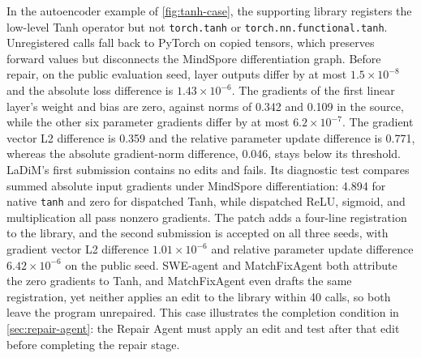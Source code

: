 In the autoencoder example of \cref{fig:tanh-case}, the supporting library registers the low-level Tanh operator but not \texttt{torch.tanh} or \texttt{torch.nn.functional.tanh}. Unregistered calls fall back to PyTorch on copied tensors, which preserves forward values but disconnects the MindSpore differentiation graph. Before repair, on the public evaluation seed, layer outputs differ by at most $1.5\times10^{-8}$ and the absolute loss difference is $1.43\times10^{-6}$. The gradients of the first linear layer's weight and bias are zero, against norms of 0.342 and 0.109 in the source, while the other six parameter gradients differ by at most $6.2\times10^{-7}$. The gradient vector L2 difference is 0.359 and the relative parameter update difference is 0.771, whereas the absolute gradient-norm difference, 0.046, stays below its threshold. LaDiM's first submission contains no edits and fails. Its diagnostic test compares summed absolute input gradients under MindSpore differentiation: 4.894 for native \texttt{tanh} and zero for dispatched Tanh, while dispatched ReLU, sigmoid, and multiplication all pass nonzero gradients. The patch adds a four-line registration to the library, and the second submission is accepted on all three seeds, with gradient vector L2 difference $1.01\times10^{-6}$ and relative parameter update difference $6.42\times10^{-6}$ on the public seed. SWE-agent and MatchFixAgent both attribute the zero gradients to Tanh, and MatchFixAgent even drafts the same registration, yet neither applies an edit to the library within 40 calls, so both leave the program unrepaired. This case illustrates the completion condition in \cref{sec:repair-agent}: the Repair Agent must apply an edit and test after that edit before completing the repair stage.

